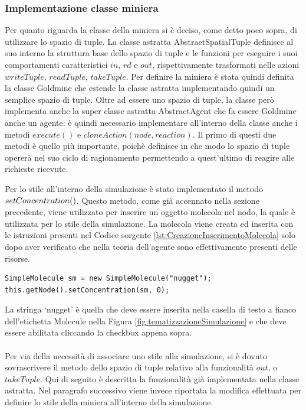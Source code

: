 \subsubsection{Implementazione classe miniera}
Per quanto riguarda la classe della miniera si è deciso, come detto poco sopra, di utilizzare lo spazio di tuple. La classe astratta AbstractSpatialTuple definisce al suo interno la struttura base dello spazio di tuple e le funzioni per eseguire i suoi comportamenti caratteristici $in$, $rd$ e $out$, rispettivamente trasformati nelle azioni $writeTuple$, $readTuple$, $takeTuple$.
Per definire la miniera è stata quindi definita la classe Goldmine che estende la classe astratta implementando quindi un semplice spazio di tuple.
Oltre ad essere uno spazio di tuple, la classe però implementa anche la super classe astratta AbstractAgent che fa essere Goldmine anche un agente: è quindi necessario implementare all'interno della classe anche i metodi $execute()$ e $cloneAction(node, reaction)$. Il primo di questi due metodi è quello più importante, poichè definisce in che modo lo spazio di tuple opererà nel suo ciclo di ragionamento permettendo a quest'ultimo di reagire alle richieste ricevute.

Per lo stile all'interno della simulazione è stato implementato il metodo $setCon\-cen\-tra\-tion()$. Questo metodo, come già accennato nella sezione precedente, viene utilizzato per inserire un oggetto molecola nel nodo, la quale è utilizzata per lo stile della simulazione. La molecola viene creata ed inserita con le istruzioni presenti nel Codice sorgente \ref{lst:CreazioneInserimentoMolecola} solo dopo aver verificato che nella teoria dell'agente sono effettivamente presenti delle risorse.

\switchToJava{}{}
\begin{lstlisting}[float,firstnumber=1,label={lst:CreazioneInserimentoMolecola},caption={Creazione e inserimento molecola}]
SimpleMolecule sm = new SimpleMolecule("nugget");
this.getNode().setConcentration(sm, 0);
\end{lstlisting}
La stringa `nugget' è quella che deve essere inserita nella casella di testo a fianco dell'etichetta Molecule nella Figura \ref{fig:tematizzazioneSimulazione} e che deve essere abilitata cliccando la checkbox appena sopra.

\paragraph*{}

Per via della necessità di associare uno stile alla simulazione, si è dovuto sovrascrivere il metodo dello spazio di tuple relativo alla funzionalità $out$, o $takeTuple$.
Qui di seguito è descritta la funzionalità già implementata nella classe astratta. Nel paragrafo successivo viene invece riportata la modifica effettuata per definire lo stile della miniera all'interno della simulazione.

